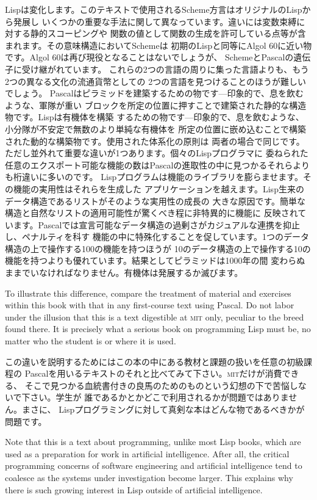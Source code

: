 \documentclass[oneside]{book}
\newcommand{\acronym}[1]{\textsc{\MakeLowercase{#1}}}
\begin{document}
Lispは変化します。このテキストで使用されるScheme方言はオリジナルのLispから発展し
いくつかの重要な手法に関して異なっています。違いには変数束縛に対する静的スコーピングや
関数の値として関数の生成を許可している点等が含まれます。その意味構造においてSchemeは
初期のLispと同等にAlgol 60に近い物です。Algol 60は再び現役となることはないでしょうが、
SchemeとPascalの遺伝子に受け継がれています。
これらの2つの言語の周りに集った言語よりも、もう2つの異なる文化の流通貨幣としての
2つの言語を見つけることのほうが難しいでしょう。
Pascalはピラミッドを建築するための物です---印象的で、息を飲むような、軍隊が重い
ブロックを所定の位置に押すことで建築された静的な構造物です。Lispは有機体を構築
するための物です---印象的で、息を飲むような、小分隊が不安定で無数のより単純な有機体を
所定の位置に嵌め込むことで構築された動的な構築物です。使用された体系化の原則は
両者の場合で同じです。ただし並外れて重要な違いが1つあります。個々のLispプログラマに
委ねられた任意のエクスポート可能な機能の数はPascalの進取性の中に見つかるそれらよりも桁違いに多いのです。
Lispプログラムは機能のライブラリを膨らませます。その機能の実用性はそれらを生成した
アプリケーションを越えます。Lisp生来のデータ構造であるリストがそのような実用性の成長の
大きな原因です。簡単な構造と自然なリストの適用可能性が驚くべき程に非特異的に機能に
反映されています。Pascalでは宣言可能なデータ構造の過剰さがカジュアルな連携を抑止し、ペナルティを科す
機能の中に特殊化することを促しています。1つのデータ構造の上で操作する100の機能を持つほうが
10のデータ構造の上で操作する10の機能を持つよりも優れています。結果としてピラミッドは1000年の間
変わらぬままでいなければなりません。有機体は発展するか滅びます。

To illustrate this difference, compare the treatment of material and exercises
within this book with that in any first-course text using Pascal.  Do not labor
under the illusion that this is a text digestible at \acronym{MIT} only,
peculiar to the breed found there.  It is precisely what a serious book on
programming Lisp must be, no matter who the student is or where it is used.

この違いを説明するためにはこの本の中にある教材と課題の扱いを任意の初級課程の
Pascalを用いるテキストのそれと比べてみて下さい。\acronym{MIT}だけが消費できる、
そこで見つかる血統書付きの良馬のためのものという幻想の下で苦悩しないで下さい。学生が
誰であるかとかどこで利用されるかが問題ではありません。まさに、
Lispプログラミングに対して真剣な本はどんな物であるべきかが問題です。

Note that this is a text about programming, unlike most Lisp books, which are
used as a preparation for work in artificial intelligence.  After all, the
critical programming concerns of software engineering and artificial
intelligence tend to coalesce as the systems under investigation become larger.
This explains why there is such growing interest in Lisp outside of artificial
intelligence.
\end{document}
